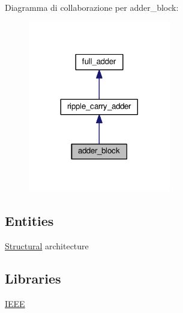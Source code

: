 Diagramma di collaborazione per adder\+\_\+block\+:\nopagebreak
\begin{figure}[H]
\begin{center}
\leavevmode
\includegraphics[width=176pt]{classadder__block__coll__graph}
\end{center}
\end{figure}
\subsection*{Entities}
\begin{DoxyCompactItemize}
\item 
\hyperlink{classadder__block_1_1_structural}{Structural} architecture
\end{DoxyCompactItemize}
\subsection*{Libraries}
 \begin{DoxyCompactItemize}
\item 
\hypertarget{classadder__block_gae4f03c286607f3181e16b9aa12d0c6d4}{\hyperlink{group___majority_voter_gae4f03c286607f3181e16b9aa12d0c6d4}{I\+E\+E\+E} }\label{classadder__block_gae4f03c286607f3181e16b9aa12d0c6d4}

\end{DoxyCompactItemize}

